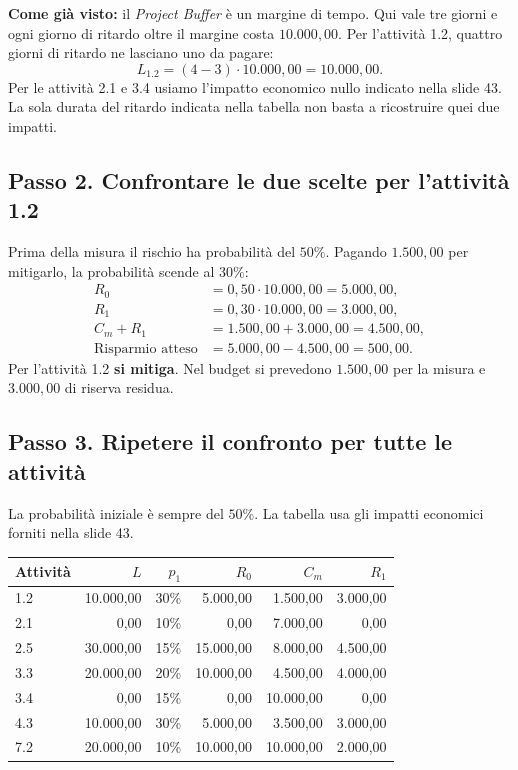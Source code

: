 \noindent \textbf{Come già visto:} il \emph{Project Buffer} è un
margine di tempo. Qui vale tre giorni e ogni giorno di ritardo
oltre il margine costa $10.000{,}00$. Per l'attività 1.2, quattro
giorni di ritardo ne lasciano uno da pagare:
\[
    L_{1.2} = (4-3)\cdot 10.000{,}00 = 10.000{,}00.
\]
\noindent Per le attività 2.1 e 3.4 usiamo l'impatto economico nullo
indicato nella slide 43. La sola durata del ritardo indicata nella
tabella non basta a ricostruire quei due impatti.

\subsection*{Passo 2. Confrontare le due scelte per l'attività 1.2}

\noindent Prima della misura il rischio ha probabilità del $50\%$.
Pagando $1.500{,}00$ per mitigarlo, la probabilità scende al $30\%$:
\begin{align*}
    R_0 &= 0{,}50 \cdot 10.000{,}00 = 5.000{,}00, \\
    R_1 &= 0{,}30 \cdot 10.000{,}00 = 3.000{,}00, \\
    C_m + R_1 &= 1.500{,}00 + 3.000{,}00 = 4.500{,}00, \\
    \text{Risparmio atteso} &= 5.000{,}00 - 4.500{,}00 = 500{,}00.
\end{align*}
\noindent Per l'attività 1.2 \textbf{si mitiga}. Nel budget si
prevedono $1.500{,}00$ per la misura e $3.000{,}00$ di riserva residua.

\subsection*{Passo 3. Ripetere il confronto per tutte le attività}

\noindent La probabilità iniziale è sempre del $50\%$.
La tabella usa gli impatti economici forniti nella slide 43.

\begin{center}
    \small
    \begin{tabular}{lrrrrr}
        \hline
        Attività & $L$ & $p_1$ & $R_0$ & $C_m$ & $R_1$ \\
        \hline
        1.2 & 10.000,00 & 30\% & 5.000,00 & 1.500,00 & 3.000,00 \\
        2.1 & 0,00 & 10\% & 0,00 & 7.000,00 & 0,00 \\
        2.5 & 30.000,00 & 15\% & 15.000,00 & 8.000,00 & 4.500,00 \\
        3.3 & 20.000,00 & 20\% & 10.000,00 & 4.500,00 & 4.000,00 \\
        3.4 & 0,00 & 15\% & 0,00 & 10.000,00 & 0,00 \\
        4.3 & 10.000,00 & 30\% & 5.000,00 & 3.500,00 & 3.000,00 \\
        7.2 & 20.000,00 & 10\% & 10.000,00 & 10.000,00 & 2.000,00 \\
        \hline
    \end{tabular}
\end{center}

